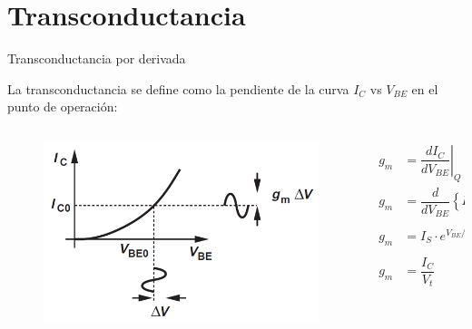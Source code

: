\documentclass[t,aspectratio=169]{beamer}
\begin{document}
\section{Transconductancia}
\begin{frame}{Transconductancia por derivada}

La transconductancia se define como la pendiente de la curva $I_C$ vs $V_{BE}$ en el punto de operación:

\begin{columns}
\begin{column}{0.5\textwidth}

\begin{figure}[H]
    \centering
    \includegraphics[width=\textwidth]{figuras/curva_transconductancia.png}
\end{figure}

\end{column}
\begin{column}{0.5\textwidth}

\begin{align*}
g_m &= \left. \dfrac{dI_C}{dV_{BE}} \right|_Q \\
g_m &= \dfrac{d}{dV_{BE}} \left\{ I_S \cdot e^{V_{BE/V_t}} \right\} \\
g_m &= I_S \cdot e^{V_{BE}/V_t} \cdot \dfrac{1}{V_t} \\
g_m &= \dfrac{I_C}{V_t} \\
\end{align*}

\end{column}
\end{columns}
    
\end{frame}
\end{document}
